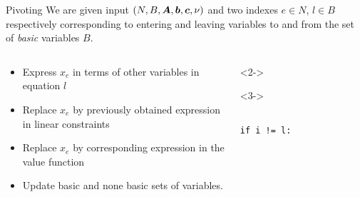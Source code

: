 \documentclass[aspectratio = 169]{beamer}
\begin{document}
\begin{frame}[fragile]{Pivoting}
  We are given input $(N, B, \boldsymbol{A}, \boldsymbol{b}, \boldsymbol{c}, \nu)$ and two
  indexes $e \in N$, $l\in B$ respectively corresponding to
  entering and leaving variables to and from the set of \textit{basic}
  variables $B$.
    \begin{columns}
        \begin{column}{.5\textwidth}
            \begin{itemize}
                \item[\textbullet]<2->
                  Express $x_e$ in terms of other variables in
                  equation $l$
                \item[\textbullet]<3->
                  Replace $x_e$ by previously obtained expression in
                  linear constraints
                \item[\textbullet]<4->
                  Replace $x_e$ by corresponding expression in the
                  value function
                \item[\textbullet]<5->
                  Update basic and none basic sets of variables.
            \end{itemize}
        \end{column}
        \begin{column}{.5\textwidth}
            \begin{overlayarea}{.96\textwidth}{.45\textheight}
            \begin{onlyenv}<2->
                \begin{tcolorbox}[
                    enhanced,
                    parbox = false,
                    colback = mLightBrown!10!white,
                    colframe = mLightBrown,
                    arc = 0mm,
                    ]
                    \small{
                    }
                    \end{tcolorbox}
            \end{onlyenv}
            \begin{onlyenv}<3->
                \begin{tcolorbox}[
                    enhanced,
                    parbox = false,
                    colback = mLightBrown!10!white,
                    colframe = mLightBrown,
                    arc = 0mm,
                    ]
                    \small{
                      \begin{verbatim}
                        if i != l:

\end{verbatim}}
\end{tcolorbox}
\end{onlyenv}
\end{overlayarea}
\end{column}
\end{columns}
\end{frame}
\end{document}
